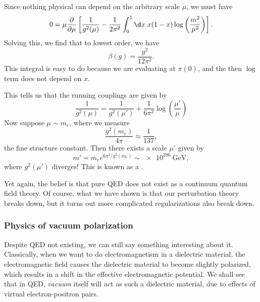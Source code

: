 \documentclass[a4paper]{article}
\begin{document}
Since nothing physical can depend on the arbitrary scale $\mu$, we must have
\[
  0 = \mu \frac{\partial}{\partial \mu} \left[\frac{1}{g^2(\mu)} - \frac{1}{2\pi^2} \int_0^1 \d x\; x(1 - x) \log\left(\frac{m^2}{\mu^2}\right)\right].
\]
Solving this, we find that to lowest order, we have
\[
  \beta(g) = \frac{g^2}{12 \pi^2}.
\]
This integral is easy to do because we are evaluating at $\pi(0)$, and the then $\log$ term does not depend on $x$.

This tells us that the running couplings are given by
\[
  \frac{1}{g^2(\mu)} = \frac{1}{g^2(\mu')} + \frac{1}{6\pi^2} \log\left(\frac{\mu'}{\mu}\right)
\]
Now suppose $\mu \sim m_e$, where we measure
\[
  \frac{g^2(m_e)}{4\pi} \approx \frac{1}{137},
\]
the fine structure constant. Then there exists a scale $\mu'$ given by
\[
  m' = m_e e^{6\pi^2/g^2(m_e)} \sim \SI{e286}{\giga\electronvolt},
\]
where $g^2(\mu')$ diverges! This is known as a .

Yet again, the belief is that pure QED does not exist as a continuum quantum field theory. Of course, what we have shown is that our perturbation theory breaks down, but it turns out more complicated regularizations also break down.

\subsubsection*{Physics of vacuum polarization}
Despite QED not existing, we can still say something interesting about it. Classically, when we want to do electromagnetism in a dielectric material, the electromagnetic field causes the dielectric material to become slightly polarized, which results in a shift in the effective electromagnetic potential. We shall see that in QED, \emph{vacuum} itself will act as such a dielectric material, due to effects of virtual electron-positron pairs.
\end{document}
